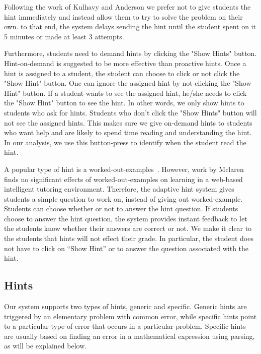 \documentclass{llncs2e/llncs}
\begin{document}
Following the work of Kulhavy and Anderson\cite{Kulhavy1972} we prefer not to give students the hint immediately and instead allow them to try to solve the problem on their own. to that end, the system delays sending the hint until the student spent on it 5 minutes or made at least 3 attempts.

Furthermore, students need to demand hints by clicking the "Show Hints" button. Hint-on-demand is suggested to be more effective than proactive hints\cite{Razzaq2010}. Once a hint is assigned to a student, the student can choose to click or not click the "Show Hint" button. One can ignore the assigned hint by not clicking the "Show Hint" button. If a student wants to see the assigned hint, he/she needs to click the "Show Hint" button to see the hint. In other words, we only show hints to students who ask for hints. Students who don't click the "Show Hints" button will not see the assigned hints. This makes sure we give on-demand hints to students who want help and are likely to spend time reading and understanding the hint.  In our analysis, we use this button-press to identify when the student read the hint.

A popular type of hint is a
worked-out-examples~\cite{Atkinson2000}. However, work by
Mclaren~\cite{McLaren2006} finds no significant effects of
worked-out-examples on learning in a web-based intelligent tutoring
environment. Therefore, the adaptive hint system gives students a
simple question to work on, instead of giving out
worked-example. Students can choose whether or not to answer the hint
question. If students choose to answer the hint question, the system
provides instant feedback to let the students know whether their
answers are correct or not. We make it clear to the students that
hints will not effect their grade. In particular, the student does not
have to click on ``Show Hint'' or to answer the question associated
with the hint.

\subsection*{Hints}

Our system supports two types of hints, generic and specific. Generic hints are triggered by an elementary problem with common error, while specific hints point to a particular type of error that occurs in a particular problem. Specific hints are usually based on finding an error in a mathematical expression using parsing, as will be explained below.
\end{document}
